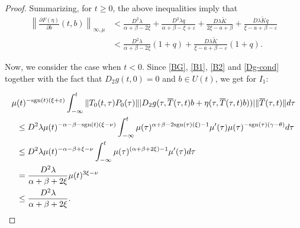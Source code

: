 \documentclass[9pt]{amsart}
\numberwithin{equation}{section}
\numberwithin{lemma}{section}
\begin{document}
\begin{proof}
Summarizing, for $t\geq0$, the above inequalities imply that
\begin{align}
    \left\|\frac{\partial F(\eta)}{\partial b}(t,b)\right\|_{\infty,\mu} &< \frac{D^2\lambda}{\alpha+\beta-2\xi} + \frac{D^2\lambda q}{\alpha+\beta-\xi+\varepsilon} + \frac{D\lambda\tilde{K}}{2\xi-a+\beta} + \frac{D\lambda\tilde{K}q}{\xi-a+\beta-\varepsilon}\nonumber\\
    &< \frac{D^2\lambda}{\alpha+\beta-2\xi}(1+q) + \frac{D\lambda\tilde{K}}{\xi-a+\beta-\varepsilon}(1+q).\label{Dftmayorcero}
\end{align}

Now, we consider the case when $t<0$. Since \eqref{BG}, \eqref{B1}, \eqref{B2} and \eqref{Dg-cond} together
with the fact that $D_2g(t,0)=0$ and $b\in U(t)$, we get for $I_1:$

\begin{equation*}
    \begin{split}
        \mu&(t)^{-\textnormal{sgn}(t)(\xi+\varepsilon)}\int_{-\infty}^{t}\|T_0(t,\tau)P_0(\tau)\| |D_2g(\tau, \overline{T}(\tau,t)b+\eta(\tau,\overline{T}(\tau,t)b))| \|\overline{T}(\tau,t)\|d\tau\\
        &\leq D^2\lambda\mu(t)^{-\alpha-\beta-\textnormal{sgn}(t)(\xi-\nu)}\int_{-\infty}^{t}\mu(\tau)^{\alpha+\beta-2\textnormal{sgn}(\tau)(\xi)-1}\mu'(\tau)\mu(\tau)^{-\textnormal{sgn}(\tau)(\gamma-\theta)}d\tau\\
        &\leq D^2\lambda\mu(t)^{-\alpha-\beta+\xi-\nu}\int_{-\infty}^{t}\mu(\tau)^{(\alpha+\beta+2\xi)-1}\mu'(\tau)d\tau\\
        &= \frac{D^2\lambda}{\alpha+\beta+2\xi}\mu(t)^{3\xi-\nu}\\
        &\leq \frac{D^2\lambda}{\alpha+\beta+2\xi}.
    \end{split}
\end{equation*}


\end{proof}
\end{document}
